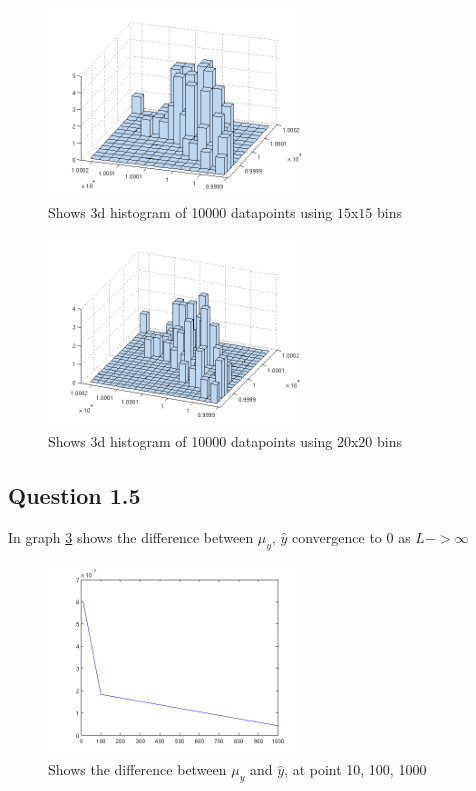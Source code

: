\documentclass[a4paper, 10pt, final]{article}
\begin{document}
\begin{figure}[!htpb]
  \centering
  \includegraphics[width=0.6\textwidth]{images/q1_4_10000_b15}
  \caption{Shows 3d histogram of 10000 datapoints using $15$x$15$ bins}
  \label{fig:q4_4_10000_b15}
\end{figure}

\begin{figure}[!htpb]
  \centering
  \includegraphics[width=0.6\textwidth]{images/q1_4_10000_b20}
  \caption{Shows 3d histogram of 10000 datapoints using $20$x$20$ bins}
  \label{fig:q4_4_10000_b20}
\end{figure}

\subsection*{Question 1.5}
In graph \ref{fig:q5} shows the difference between $\mu _y$, $\hat{y}$ convergence to 0 as $L -> \infty$

\begin{figure}[!ht]
  \centering
  \includegraphics[width=0.6\textwidth]{images/q5_L10_L100_L1000}
  \caption{Shows the difference between $\mu _y$ and $\hat{y}$, at point 10, 100, 1000}
  \label{fig:q5}
\end{figure}
\end{document}
